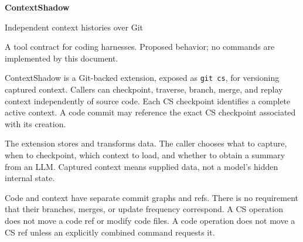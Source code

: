 \documentclass[11pt,letterpaper]{article}
\newcommand{\sect}[1]{\vspace{5pt}{\large\bfseries\textcolor{ink}{#1}}\par\vspace{1pt}}
\newcommand{\subsect}[1]{\vspace{3pt}{\bfseries\textcolor{ink}{#1}}\par}
\newcommand{\code}[1]{{\small\texttt{#1}}}
\begin{document}
{\LARGE\bfseries\textcolor{ink}{ContextShadow}}\par
{\large Independent context histories over Git}\par
\textcolor{muted}{A tool contract for coding harnesses. Proposed behavior; no commands are implemented by this document.}

\sect{1. Purpose and boundary}
ContextShadow is a Git-backed extension, exposed as \code{git cs}, for versioning
captured context. Callers can checkpoint, traverse, branch, merge, and replay
context independently of source code. Each CS checkpoint identifies a complete
active context. A code commit may reference the exact CS checkpoint associated
with its creation.

The extension stores and transforms data. The caller chooses what to capture,
when to checkpoint, which context to load, and whether to obtain a summary from
an LLM. Captured context means supplied data, not a model's hidden internal state.

\subsect{Independent histories are the default}
Code and context have separate commit graphs and refs. There is no requirement
that their branches, merges, or update frequency correspond. A CS operation
does not move a code ref or modify code files. A code operation does not move
a CS ref unless an explicitly combined command requests it.

\begin{center}
\end{center}
\end{document}
